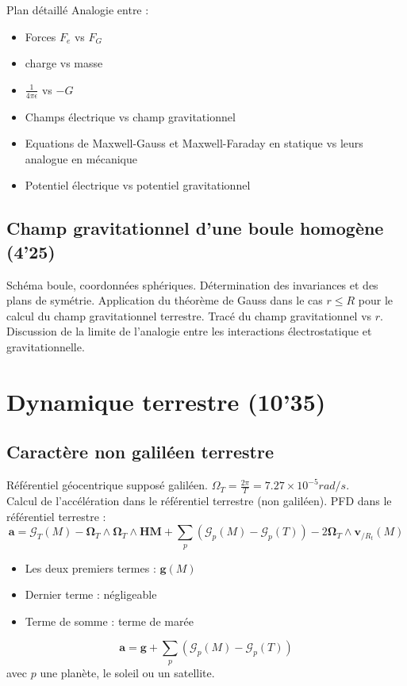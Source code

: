 \begin{reportBlock}{Plan détaillé}
Analogie entre :

\begin{itemize}
\item Forces $F_e$ vs $F_G$
\item charge vs masse
\item $\frac{1}{4 \pi \epsilon}$ vs $-G$
\item Champs électrique vs champ gravitationnel
\item Equations de Maxwell-Gauss et Maxwell-Faraday en statique vs leurs analogue en mécanique
\item Potentiel électrique vs potentiel gravitationnel
\end{itemize}

\subsection{Champ gravitationnel d'une boule homogène (4'25)}

Schéma boule, coordonnées sphériques. Détermination des invariances et des plans de symétrie. Application du théorème de Gauss dans le cas $r\leq R$ pour le calcul du champ gravitationnel terrestre. Tracé du champ gravitationnel vs $r$. Discussion de la limite de l'analogie entre les interactions électrostatique et gravitationnelle.

\section{Dynamique terrestre (10'35)}

\subsection{Caractère non galiléen terrestre}

Référentiel géocentrique supposé galiléen.
$\Omega_T = \frac{2 \pi}{T}=7.27\times10^{-5} rad/s$.  \\

Calcul de l'accélération dans le référentiel terrestre (non galiléen). PFD dans le référentiel terrestre :
\begin{equation}
    \mathbf a = \mathbf{\mathcal{G}}_T(M) - \mathbf \Omega_T \land \mathbf \Omega_T \land \mathbf{HM} + \sum_p \left(\mathbf{\mathcal{G}}_p(M) - \mathbf{\mathcal{G}}_p(T) \right) - 2  \mathbf \Omega_T \land \mathbf v_{/R_t}(M)
\end{equation}
\begin{itemize}
    \item Les deux premiers termes : $\mathbf g(M)$ 
    \item Dernier terme : négligeable
    \item Terme de somme : terme de marée
\end{itemize}
\begin{equation}
    \mathbf{a} = \mathbf{g} + \sum_{p} \left( \mathbf{\mathcal{G}}_p(M) - \mathbf{\mathcal{G}}_p(T) \right)
\end{equation}
avec $p$ une planète, le soleil ou un satellite.\\


\end{reportBlock}
